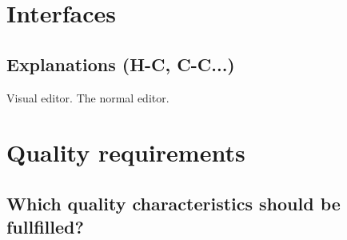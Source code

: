 \documentclass{article}
\begin{document}
\section{Interfaces}

\subsection{Explanations (H-C, C-C...)}

Visual editor. The normal editor.

\section{Quality requirements}

\subsection{Which quality characteristics should be fullfilled?}
\end{document}

